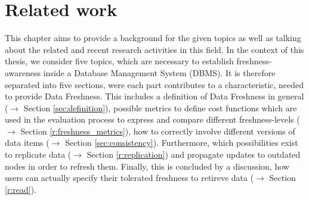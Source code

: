
\chapter{Related work}
\label{c:related}




This chapter aims to provide a background for the given topics as well as talking about the related and recent research 
activities in this field. In the context of this thesis, we consider five topics, which are necessary to establish 
freshness-awareness inside a Database Management System (DBMS).
It is therefore separated into five sections, were each part contributes to a characteristic, needed to 
provide Data Freshness. This includes a definition of Data Freshness in general ($\rightarrow$ Section \ref{sec:definition}), 
possible metrics to define cost functions which are used
in the evaluation process to express and compare different freshness-levels ($\rightarrow$ Section \ref{r:freshness_metrics}), 
how to correctly involve different versions of data items ($\rightarrow$ Section \ref{sec:consistency}). 
Furthermore, which possibilities exist to replicate data ($\rightarrow$ Section \ref{r:replication}) 
and propagate updates to outdated nodes in order to refresh them.
Finally, this is concluded by a discussion, how users can actually specify their tolerated freshness to retireve data ($\rightarrow$ Section \ref{r:read}).




